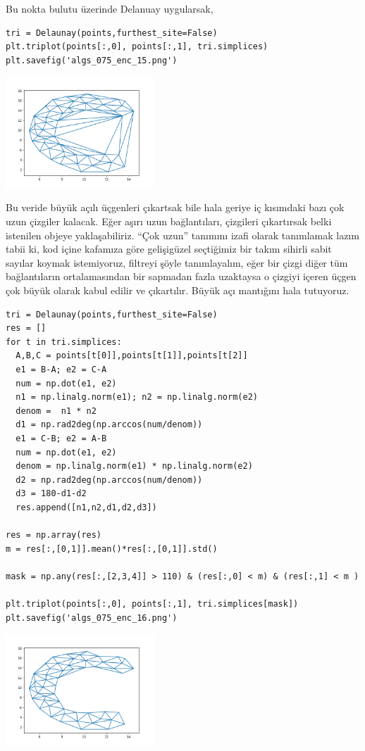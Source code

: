 \documentclass[12pt,fleqn]{article}\usepackage{../../common}
\begin{document}
Bu nokta bulutu üzerinde Delanuay uygularsak,

\begin{verbatim}
tri = Delaunay(points,furthest_site=False)
plt.triplot(points[:,0], points[:,1], tri.simplices)
plt.savefig('algs_075_enc_15.png')
\end{verbatim}

\includegraphics[width=15em]{algs_075_enc_15.png}

Bu veride büyük açılı üçgenleri çıkartsak bile hala geriye iç kısımdaki bazı çok
uzun çizgiler kalacak. Eğer aşırı uzun bağlantıları, çizgileri çıkartırsak belki
istenilen objeye yaklaşabiliriz. ``Çok uzun'' tanımını izafi olarak tanımlamak
lazım tabii ki, kod içine kafamıza göre gelişigüzel seçtiğimiz bir takım sihirli
sabit sayılar koymak istemiyoruz, filtreyi şöyle tanımlayalım, eğer bir çizgi
diğer tüm bağlantıların ortalamasından bir sapmadan fazla uzaktaysa o çizgiyi
içeren üçgen çok büyük olarak kabul edilir ve çıkartılır. Büyük açı mantığını
hala tutuyoruz.


\begin{verbatim}
tri = Delaunay(points,furthest_site=False)
res = []
for t in tri.simplices:
  A,B,C = points[t[0]],points[t[1]],points[t[2]]
  e1 = B-A; e2 = C-A
  num = np.dot(e1, e2)
  n1 = np.linalg.norm(e1); n2 = np.linalg.norm(e2)
  denom =  n1 * n2
  d1 = np.rad2deg(np.arccos(num/denom))
  e1 = C-B; e2 = A-B
  num = np.dot(e1, e2)
  denom = np.linalg.norm(e1) * np.linalg.norm(e2)
  d2 = np.rad2deg(np.arccos(num/denom))
  d3 = 180-d1-d2
  res.append([n1,n2,d1,d2,d3])

res = np.array(res)
m = res[:,[0,1]].mean()*res[:,[0,1]].std()

mask = np.any(res[:,[2,3,4]] > 110) & (res[:,0] < m) & (res[:,1] < m )

plt.triplot(points[:,0], points[:,1], tri.simplices[mask])
plt.savefig('algs_075_enc_16.png')
\end{verbatim}

\includegraphics[width=15em]{algs_075_enc_16.png}
\end{document}
